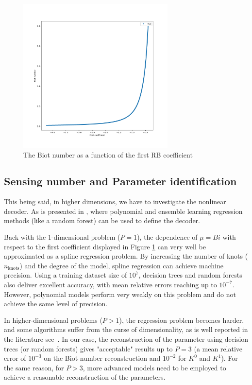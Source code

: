 \documentclass[graybox]{svmult}
\begin{document}
\begin{figure}[!htbp]
    \centering
\includegraphics[width=0.7\textwidth] {img-dataP1Inverse.png}
    \caption{ The Biot number as a function of the first RB coefficient}
    \label{fig:dataP1Inverse}
\end{figure}

\subsection{Sensing number and Parameter identification}
\label{subsec:3.3}

This being said, in higher dimensions, we have to investigate the nonlinear decoder. As is presented in \cite {barnett2022quadratic, barnett2023, cohen2023nonlinear}, where polynomial and ensemble learning regression methods (like a random forest) can be used to define the decoder.


Back with the 1-dimensional problem ($P=1$),  the dependence of $\mu = Bi$ with respect to the first coefficient displayed 
in Figure \ref{fig:dataP1Inverse}
 can very well be approximated as a spline regression problem. By increasing the number of knots ($n_{\text{knots}}$) and the degree of the model, spline regression can achieve machine precision. Using a training dataset size of $10^7$, decision trees and random forests also deliver excellent accuracy, with mean relative errors reaching up to $10^{-7}$. However, polynomial models perform very weakly on this problem and do not achieve the same level of precision.

In higher-dimensional problems ($P>1$), the regression problem becomes harder, and some algorithms suffer from the curse of dimensionality, as is well reported in the literature
see~\cite{curse}. In our case, the reconstruction of the parameter using decision trees (or random forests) gives "acceptable" results up to $P=3$ (a mean relative error of $10^{-3}$ on the Biot number reconstruction and $10^{-2}$ for $K^0$ and $K^1$). For the same reason, for $P>3$, more advanced models need to be employed to achieve a reasonable reconstruction of the parameters.
\end{document}
